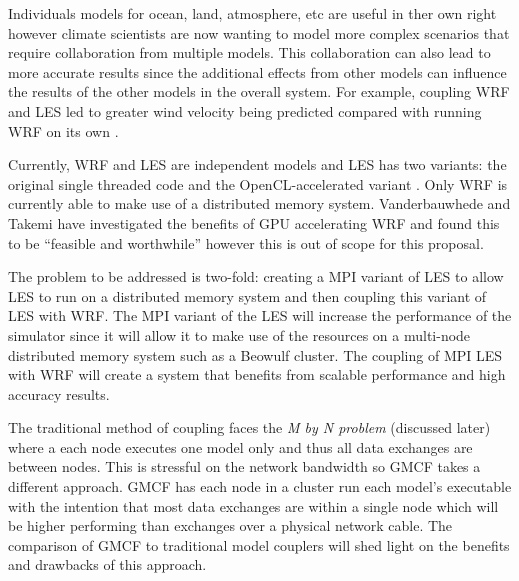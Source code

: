 Individuals models for ocean, land, atmosphere, etc are useful in ther own right
however climate scientists are now wanting to model more complex scenarios that
require collaboration from multiple models. This collaboration can also lead to
more accurate results since the additional effects from other models can
influence the results of the other models in the overall system. For example,
coupling WRF and LES led to greater wind velocity being predicted compared with
running WRF on its own \cite{Kinbara2010,Nakayama1998}.

Currently, WRF and LES are independent models and LES has two variants: the
original single threaded code and the OpenCL-accelerated variant
\cite{Vanderbauwhede2014}. Only WRF is currently able to make use of a
distributed memory system. Vanderbauwhede and Takemi \cite{Vanderbauwhede2013}
have investigated the benefits of GPU accelerating WRF and found this to be
``feasible and worthwhile'' however this is out of scope for this proposal.

The problem to be addressed is two-fold: creating a MPI variant of LES to allow
LES to run on a distributed memory system and then coupling this variant of LES
with WRF. The MPI variant of the LES will increase the performance of the
simulator since it will allow it to make use of the resources on a multi-node
distributed memory system such as a Beowulf cluster. The coupling of MPI LES
with WRF will create a system that benefits from scalable performance and high
accuracy results.

The traditional method of coupling faces the \textit{M by N problem} (discussed
later) where a each node executes one model only and thus all data exchanges are
between nodes. This is stressful on the network bandwidth so GMCF takes a
different approach. GMCF has each node in a cluster run each model's executable
with the intention that most data exchanges are within a single node which will
be higher performing than exchanges over a physical network cable. The
comparison of GMCF to traditional model couplers will shed light on the benefits
and drawbacks of this approach.
